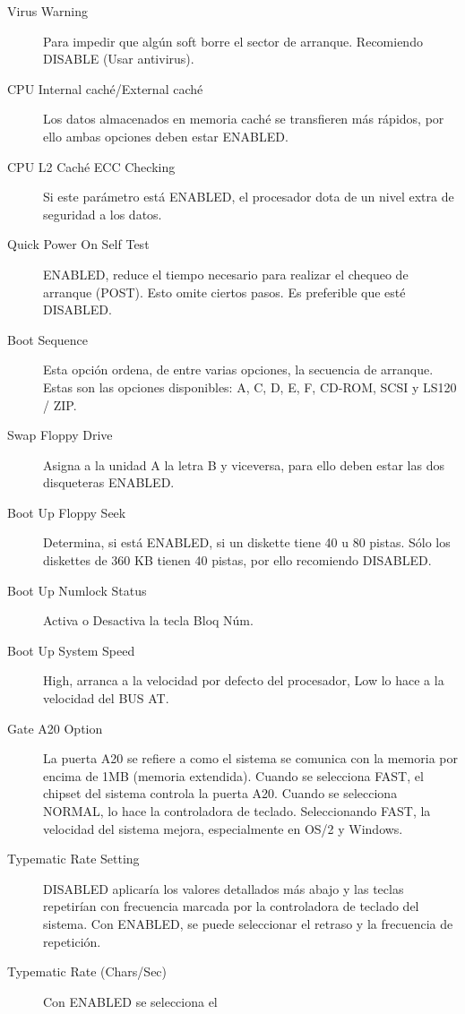 \documentclass[12pt,oneside,a4paper]{article}
\begin{document}
			\begin{description}
				\item[Virus Warning] Para impedir que algún soft borre el
					sector de arranque. Recomiendo DISABLE (Usar antivirus).
				\item[CPU Internal caché/External caché] Los datos almacenados
					en memoria caché se transfieren más rápidos, por ello ambas
					opciones deben estar ENABLED.
				\item[CPU L2 Caché ECC Checking] Si este parámetro está
					ENABLED, el procesador dota de un nivel extra de seguridad
					a los datos.
				\item[Quick Power On Self Test] ENABLED, reduce el tiempo
					necesario para realizar el chequeo de arranque (POST). Esto
					omite ciertos pasos. Es preferible que esté DISABLED.
				\item[Boot Sequence] Esta opción ordena, de entre varias
					opciones, la secuencia de arranque. Estas son las opciones
					disponibles: A, C, D, E, F, CD-ROM, SCSI y LS120 / ZIP.
				\item[Swap Floppy Drive] Asigna a la unidad A la letra B y
					viceversa, para ello deben estar las dos disqueteras
					ENABLED.
				\item[Boot Up Floppy Seek] Determina, si está ENABLED, si un
					diskette tiene 40 u 80 pistas. Sólo los diskettes de 360 KB
					tienen 40 pistas, por ello recomiendo DISABLED.
				\item[Boot Up Numlock Status] Activa o Desactiva la tecla Bloq
					Núm.
				\item[Boot Up System Speed] High, arranca a la velocidad por
					defecto del procesador, Low lo hace a la velocidad del BUS
					AT.
				\item[Gate A20 Option] La puerta A20 se refiere a como el
					sistema se comunica con la memoria por encima de 1MB
					(memoria extendida). Cuando se selecciona FAST, el chipset
					del sistema controla la puerta A20. Cuando se selecciona
					NORMAL, lo hace la controladora de teclado. Seleccionando
					FAST, la velocidad del sistema mejora, especialmente en
					OS/2 y Windows.
				\item[Typematic Rate Setting] DISABLED aplicaría los valores
					detallados más abajo y las teclas repetirían con frecuencia
					marcada por la controladora de teclado del sistema. Con
					ENABLED, se puede seleccionar el retraso y la frecuencia de
					repetición.
				\item[Typematic Rate (Chars/Sec)] Con ENABLED se selecciona el

\end{description}
\end{document}
